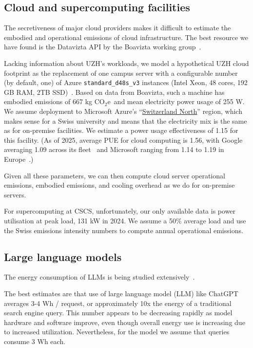 \documentclass[11pt]{article}
\newcommand{\coe}{CO$_2$e}
\newcommand{\gcoe}{g \coe}
\newcommand{\kgcoe}{k\gcoe}
\begin{document}
\subsection{Cloud and supercomputing facilities}

The secretiveness of major cloud providers makes it difficult to estimate the embodied and operational emissions of cloud infrastructure. The best resource we have found is the Datavizta API by the Boavizta working group~\cite{boavizta:api}.

Lacking information about UZH's workloads, we model a hypothetical UZH cloud footprint as the replacement of one campus server with a configurable number (by default, one) of Azure {\tt standard\_d48s\_v3} instances (Intel Xeon, 48 cores, 192 GB RAM, 2TB SSD)~\cite{msftvms}. Based on data from Boavizta, such a machine has embodied emissions of 667 \kgcoe\ and mean electricity power usage of 255 W. We assume deployment to Microsoft Azure's ``\href{https://datacenters.microsoft.com/globe/explore?info=region_switzerlandnorth}{Switzerland North}'' region, which makes sense for a Swiss university and means that the electricity mix is the same as for on-premise facilities. We estimate a power usage effectiveness of 1.15 for this facility. (As of 2025, average PUE for cloud computing is 1.56, with Google averaging 1.09 across its fleet~\cite{google:datacenter:efficiency} and Microsoft ranging from 1.14 to 1.19 in Europe~\cite{microsoft:datacenter:efficiency}.)

Given all these parameters, we can then compute cloud server operational emissions, embodied emissions, and cooling overhead as we do for on-premise servers.

For supercomputing at CSCS, unfortunately, our only available data is power utilisation at peak load, 131 kW in 2024. We assume a 50\% average load and use the Swiss emissions intensity numbers to compute annual operational emissions.

\subsection{Large language models}

The energy consumption of LLMs is being studied extensively~\cite{budennyy2022eco2ai,castano2023exploring,devries2023growing,gowda2024watt,harding2024watts,heguerte2023estimate,luccioni2022estimating,luccioni2023counting,patterson2021carbon,rodriguez2024evaluating,tripp2024measuring}.

The best estimates are that use of large language model (LLM) like ChatGPT averages 3-4 Wh / request, or approximately 10x the energy of a traditional search engine query. This number appears to be decreasing rapidly as model hardware and software improve, even though overall energy use is increasing due to increased utilization. Nevertheless, for the model we assume that queries consume 3 Wh each.
\end{document}

